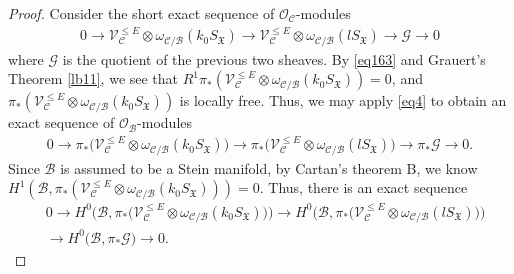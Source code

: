 \documentclass[12pt,a4paper,notitlepage]{report}
\theoremstyle{definition}
\theoremstyle{plain}
\newcommand{\fk}{\mathfrak}
\newcommand{\mc}{\mathcal}
\newcommand{\scr}{\mathscr}
\numberwithin{equation}{section}
\begin{document}
\begin{proof}
Consider the short exact sequence of $\scr O_{\mc C}$-modules
\begin{align*}
0\rightarrow \scr V_{\mc C}^{\leq E}\otimes\omega_{\mc C/\mc B}(k_0S_{\fk X})\rightarrow \scr V_{\mc C}^{\leq E}\otimes\omega_{\mc C/\mc B}(lS_{\fk X})\rightarrow\scr G\rightarrow 0
\end{align*}
where $\scr G$ is the quotient of the previous two sheaves. By \eqref{eq163} and Grauert's Theorem \ref{lb11}, we see that $R^1\pi_*(\scr V_{\mc C}^{\leq E}\otimes\omega_{\mc C/\mc B}(k_0S_{\fk X}))=0$, and $\pi_*(\scr V_{\mc C}^{\leq E}\otimes\omega_{\mc C/\mc B}(k_0S_{\fk X}))$ is locally free. Thus, we may apply  \eqref{eq4} to obtain an exact sequence of $\scr O_{\mc B}$-modules
\begin{align*}
0\rightarrow \pi_*\big(\scr V_{\mc C}^{\leq E}\otimes\omega_{\mc C/\mc B}(k_0S_{\fk X})\big)\rightarrow \pi_*\big(\scr V_{\mc C}^{\leq E}\otimes\omega_{\mc C/\mc B}(lS_{\fk X})\big)\rightarrow \pi_*\scr G\rightarrow 0.
\end{align*}
Since $\mc B$ is assumed to be a Stein manifold, by Cartan's theorem B, we know $H^1(\mc B,\pi_*(\scr V_{\mc C}^{\leq E}\otimes\omega_{\mc C/\mc B}(k_0S_{\fk X})))=0$. Thus, there is an exact sequence
\begin{align}
&0\rightarrow H^0\big(\mc B,\pi_*\big(\scr V_{\mc C}^{\leq E}\otimes\omega_{\mc C/\mc B}(k_0S_{\fk X})\big)\big)\rightarrow H^0\big(\mc B,\pi_*\big(\scr V_{\mc C}^{\leq E}\otimes\omega_{\mc C/\mc B}(lS_{\fk X})\big)\big)\nonumber\\
&\rightarrow H^0\big(\mc B,\pi_*\scr G\big)\rightarrow 0. \label{eq170}
\end{align}


\end{proof}
\end{document}
